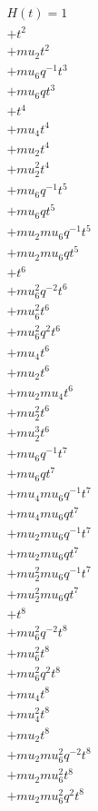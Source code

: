 \begin{align*}
H(t) = {}1 \\
  + t^{2} \\
  + mu_2 t^{2} \\
  + mu_6 q^{-1} t^{3} \\
  + mu_6 q t^{3} \\
  + t^{4} \\
  + mu_4 t^{4} \\
  + mu_2 t^{4} \\
  + mu_2^{2} t^{4} \\
  + mu_6 q^{-1} t^{5} \\
  + mu_6 q t^{5} \\
  + mu_2 mu_6 q^{-1} t^{5} \\
  + mu_2 mu_6 q t^{5} \\
  + t^{6} \\
  + mu_6^{2} q^{-2} t^{6} \\
  + mu_6^{2} t^{6} \\
  + mu_6^{2} q^{2} t^{6} \\
  + mu_4 t^{6} \\
  + mu_2 t^{6} \\
  + mu_2 mu_4 t^{6} \\
  + mu_2^{2} t^{6} \\
  + mu_2^{3} t^{6} \\
  + mu_6 q^{-1} t^{7} \\
  + mu_6 q t^{7} \\
  + mu_4 mu_6 q^{-1} t^{7} \\
  + mu_4 mu_6 q t^{7} \\
  + mu_2 mu_6 q^{-1} t^{7} \\
  + mu_2 mu_6 q t^{7} \\
  + mu_2^{2} mu_6 q^{-1} t^{7} \\
  + mu_2^{2} mu_6 q t^{7} \\
  + t^{8} \\
  + mu_6^{2} q^{-2} t^{8} \\
  + mu_6^{2} t^{8} \\
  + mu_6^{2} q^{2} t^{8} \\
  + mu_4 t^{8} \\
  + mu_4^{2} t^{8} \\
  + mu_2 t^{8} \\
  + mu_2 mu_6^{2} q^{-2} t^{8} \\
  + mu_2 mu_6^{2} t^{8} \\
  + mu_2 mu_6^{2} q^{2} t^{8} \\

\end{align*}
